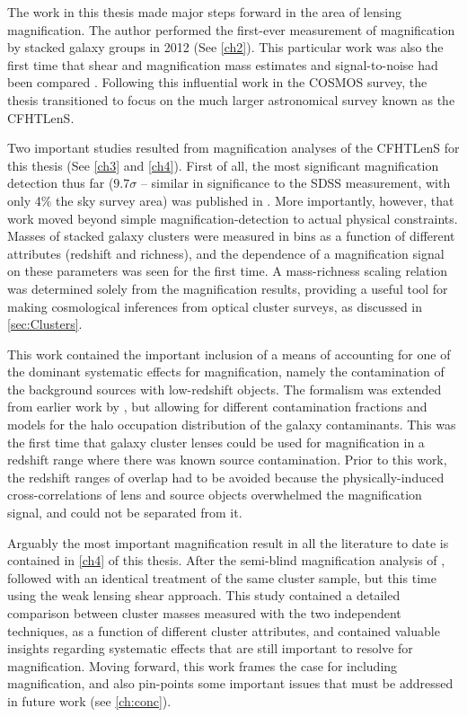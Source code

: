 The work in this thesis made major steps forward in the area of lensing magnification. The author performed the first-ever measurement of magnification by stacked galaxy groups in 2012 (See \autoref{ch2}). This particular work was also the first time that shear and magnification mass estimates and signal-to-noise had been compared \citep{Ford12}. Following this influential work in the \acf{COSMOS} survey, the thesis transitioned to focus on the much larger astronomical survey known as the \acf{CFHTLenS}. 

Two important studies resulted from magnification analyses of the \ac{CFHTLenS} for this thesis (See \autoref{ch3} and \autoref{ch4}). First of all, the most significant magnification detection thus far ($9.7\sigma$ -- similar in significance to the \ac{SDSS} measurement, with only 4\% the sky survey area) was published in \citet{Ford14}. More importantly, however, that work moved beyond simple magnification-detection to actual physical constraints. Masses of stacked galaxy clusters were measured in bins as a function of different attributes (redshift and richness), and the dependence of a magnification signal on these parameters was seen for the first time. A mass-richness scaling relation was determined solely from the magnification results, providing a useful tool for making cosmological inferences from optical cluster surveys, as discussed in \autoref{sec:Clusters}. 

This work contained the important inclusion of a means of accounting for one of the dominant systematic effects for magnification, namely the contamination of the background sources with low-redshift objects. The formalism was extended from earlier work by \citet{Hildebrandt13}, but allowing for different contamination fractions and models for the halo occupation distribution of the galaxy contaminants. This was the first time that galaxy cluster lenses could be used for magnification in a redshift range where there was known source contamination. Prior to this work, the redshift ranges of overlap had to be avoided because the physically-induced cross-correlations of lens and source objects overwhelmed the magnification signal, and could not be separated from it.

Arguably the most important magnification result in all the literature to date is contained in \autoref{ch4} of this thesis. After the semi-blind magnification analysis of \citet{Ford14}, \citet{Ford15} followed with an identical treatment of the same cluster sample, but this time using the weak lensing shear approach. This study contained a detailed comparison between cluster masses measured with the two independent techniques, as a function of different cluster attributes, and contained valuable insights regarding systematic effects that are still important to resolve for magnification. Moving forward, this work frames the case for including magnification, and also pin-points some important issues that must be addressed in future work (see \autoref{ch:conc}).

